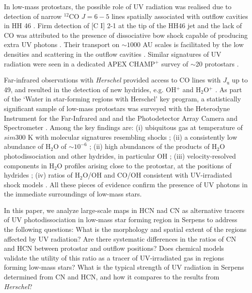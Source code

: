 \documentclass{aa}
\begin{document}
In low-mass protostars, the possible role of UV radiation was realised due to detection 
of narrow $^{12}$CO $J=6-5$ lines spatially associated with outflow cavities in HH 46 \citet{vK09}. 
Firm detection of [C I] 2-1 at the tip of the HH46 jet and the lack of CO was attributed 
to the presence of dissociative bow shock capable of producing extra UV photons \citep{ND89}. 
Their transport on $\sim1000$ AU scales is facilitated by the low densities and
 scattering in the outflow cavities \citep{Spa95}. Similar signatures of UV radiation 
 were seen in a dedicated APEX CHAMP$^+$ survey of $\sim$20 protostars \citep{Yil12,Yil15}. 

Far-infrared observations with \textit{Herschel} provided access to CO lines with $J_\mathrm{u}$ up to 49,
and resulted in the detection of new hydrides, e.g. OH$^+$ \citep{Wyr10} and 
H$_2$O$^{+}$ \citep{Oss10}. As part of the `Water in star-forming regions with Herschel' 
\citep[WISH,][]{WISH} key program, a statistically significant sample of low-mass protostars 
was surveyed with the Heterodyne Instrument for the Far-Infrared \citep[HIFI,][]{dGr10} and 
and the Photodetector Array Camera and Spectrometer \citep[PACS,][]{Pog10}. Among the key 
findings are: (i) ubiquitous gas at temperature of $sim$300 K with molecular signatures
 resembling shocks \citep{Her12,Goi12,Kar13}; (ii) a consistently low abundance of H$_2$O of $\sim10^{-6}$ \citep{Kri17}; 
(ii) high abundances of the products of H$_2$O photodissociation and other hydrides, in particular OH \citep{Wam13,Ben16}; 
(iii) velocity-resolved components in H$_2$O profiles arising close to the protostar, at the 
positions of hydrides \citep{Kri13}; (iv) ratios of H$_2$O/OH and CO/OH consistent with UV-irradiated shock models \citep{Kar18}.
All these pieces of evidence confirm the presence of UV photons in the immediate surroundings 
of low-mass stars. 

In this paper, we analyze large-scale maps in HCN nad CN as alternative tracers of UV 
photodissociation in low-mass star forming region in Serpens to address the following 
questions: What is the morphology and spatial extent of the regions affected by UV radiation? 
Are there systematic differences in the ratios of CN and HCN between protostar and outflow positions? 
Does chemical models validate the utility of this ratio as a tracer of UV-irradiated gas 
in regions forming low-mass stars? What is the typical strength of UV radiation in Serpens determined
from CN and HCN, and how it compares to the results from \textit{Herschel}? 
\end{document}
